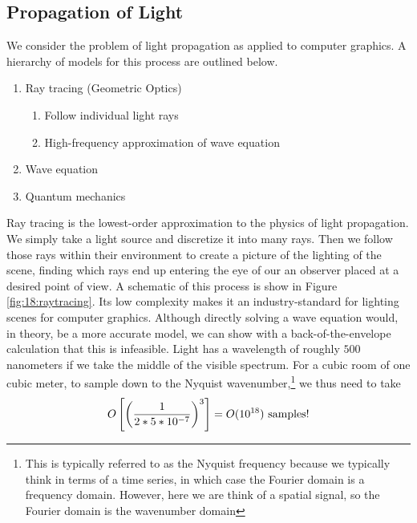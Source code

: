 \subsection{Propagation of Light}
We consider the problem of light propagation as applied to computer graphics. A hierarchy of models for this process are outlined below.
\begin{enumerate}
    \item Ray tracing (Geometric Optics)
        \begin{enumerate}
            \item Follow individual light rays
            \item High-frequency approximation of wave equation
        \end{enumerate}
    \item Wave equation
    \item Quantum mechanics
\end{enumerate}
Ray tracing is the lowest-order approximation to the physics of light propagation. We simply take a light source and discretize it into many rays. Then we follow those rays within their environment to create a picture of the lighting of the scene, finding which rays end up entering the eye of our an observer placed at a desired point of view. A schematic of this process is show in Figure \ref{fig:18:raytracing}. Its low complexity makes it an industry-standard for lighting scenes for computer graphics. Although directly solving a wave equation would, in theory, be a more accurate model, we can show with a back-of-the-envelope calculation that this is infeasible. Light has a wavelength of roughly $500$ nanometers if we take the middle of the visible spectrum. For a cubic room of one cubic meter, to sample down to the Nyquist wavenumber,\footnote{This is typically referred to as the Nyquist frequency because we typically think in terms of a time series, in which case the Fourier domain is a frequency domain. However, here we are think of a spatial signal, so the Fourier domain is the wavenumber domain} we thus need to take 
\begin{align*}
O\left[\left(\frac{1}{2 * 5 * 10^{-7}}\right)^{3}\right]=O(10^{18}) \textup{ samples!} 
\end{align*}
